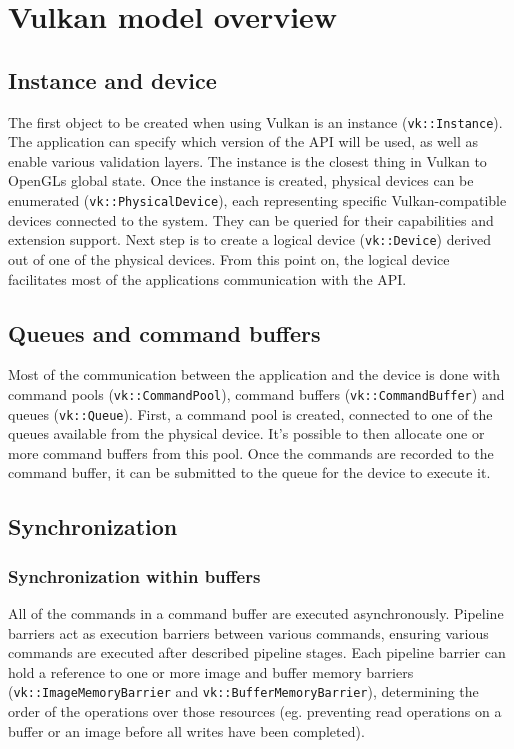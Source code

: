 \documentclass[times, utf8, zavrsni, numeric]{fer}
\begin{document}
\section{Vulkan model overview}
\subsection{Instance and device}
The first object to be created when using Vulkan is an instance (\texttt{vk::Instance}). The application can specify which version of the API will be used, as well as enable various validation layers. The instance is the closest thing in Vulkan to OpenGLs global state. Once the instance is created, physical devices can be enumerated (\texttt{vk::PhysicalDevice}), each representing specific Vulkan-compatible devices connected to the system. They can be queried for their capabilities and extension support. Next step is to create a logical device (\texttt{vk::Device}) derived out of one of the physical devices. From this point on, the logical device facilitates most of the applications communication with the API.

\subsection{Queues and command buffers}
Most of the communication between the application and the device is done with command pools (\texttt{vk::CommandPool}), command buffers (\texttt{vk::CommandBuffer}) and queues (\texttt{vk::Queue}). First, a command pool is created, connected to one of the queues available from the physical device. It's possible to then allocate one or more command buffers from this pool. Once the commands are recorded to the command buffer, it can be submitted to the queue for the device to execute it.

\subsection{Synchronization}
\subsubsection{Synchronization within buffers}
All of the commands in a command buffer are executed asynchronously. Pipeline barriers act as execution barriers between various commands, ensuring various commands are executed after described pipeline stages. Each pipeline barrier can hold a reference to one or more image and buffer memory barriers (\texttt{vk::ImageMemoryBarrier} and \texttt{vk::BufferMemoryBarrier}), determining the order of the operations over those resources (eg. preventing read operations on a buffer or an image before all writes have been completed).
\end{document}
